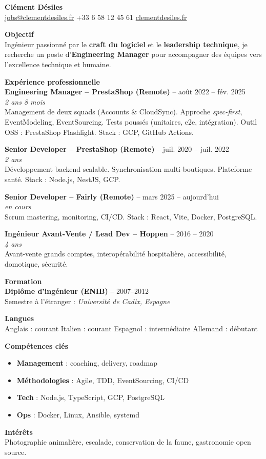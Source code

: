 \documentclass[a4paper,10pt]{article}
\newcommand{\sectiontitle}[1]{\vspace{1.2em}\textbf{\Large #1}\vspace{0.5em}\\}
\newcommand{\job}[3]{\textbf{#1} -- #2\\\textit{#3}\\}
\newcommand{\skill}[1]{\textbf{#1}}
\begin{document}
\begin{center}
    {\Huge \textbf{Clément Désiles}}\\
    \vspace{0.2cm}
    \href{mailto:jobs@clementdesiles.fr}{jobs@clementdesiles.fr} \textbullet{} +33 6 58 12 45 61 \textbullet{} \href{https://clementdesiles.fr}{clementdesiles.fr}
\end{center}

\sectiontitle{Objectif}
Ingénieur passionné par le \textbf{craft du logiciel} et le \textbf{leadership technique}, je recherche un poste d'\textbf{Engineering Manager} pour accompagner des équipes vers l’excellence technique et humaine.

\sectiontitle{Expérience professionnelle}

\job{Engineering Manager – PrestaShop (Remote)}{août 2022 – fév. 2025}{2 ans 8 mois}
Management de deux squads (Accounts & CloudSync). Approche \textit{spec-first}, EventModeling, EventSourcing. Tests poussés (unitaires, e2e, intégration). Outil OSS : PrestaShop Flashlight. Stack : GCP, GitHub Actions.

\job{Senior Developer – PrestaShop (Remote)}{juil. 2020 – juil. 2022}{2 ans}
Développement backend scalable. Synchronisation multi-boutiques. Plateforme santé. Stack : Node.js, NestJS, GCP.

\job{Senior Developer – Fairly (Remote)}{mars 2025 – aujourd'hui}{en cours}
Scrum mastering, monitoring, CI/CD. Stack : React, Vite, Docker, PostgreSQL.

\job{Ingénieur Avant-Vente / Lead Dev – Hoppen}{2016 – 2020}{4 ans}
Avant-vente grands comptes, interopérabilité hospitalière, accessibilité, domotique, sécurité.

\sectiontitle{Formation}
\textbf{Diplôme d'ingénieur (ENIB)} -- 2007–2012\\
Semestre à l'étranger : \textit{Université de Cadix, Espagne}

\sectiontitle{Langues}
Anglais : courant \textbullet{} Italien : courant \textbullet{} Espagnol : intermédiaire \textbullet{} Allemand : débutant

\sectiontitle{Compétences clés}
\begin{itemize}
  \item \skill{Management} : coaching, delivery, roadmap
  \item \skill{Méthodologies} : Agile, TDD, EventSourcing, CI/CD
  \item \skill{Tech} : Node.js, TypeScript, GCP, PostgreSQL
  \item \skill{Ops} : Docker, Linux, Ansible, systemd
\end{itemize}

\sectiontitle{Intérêts}
Photographie animalière, escalade, conservation de la faune, gastronomie open source.
\end{document}
